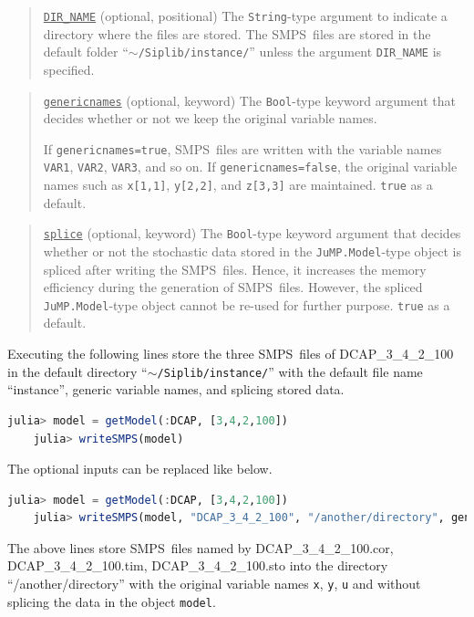 \documentclass{hitec}
\newcommand{\smps}{\textsf{SMPS}}
\newcommand{\jumpmodel}{\texttt{JuMP.Model}}
\begin{document}
	\begin{quote}
		\noindent\underline{\texttt{DIR\_NAME}} (optional, positional) The \texttt{String}-type argument to indicate a directory where the files are stored. The \smps\ files are stored in the default folder ``\texttt{$\sim$/Siplib/instance/}'' unless the argument \texttt{DIR\_NAME} is specified.
	\end{quote}
	
	\begin{quote}
		\noindent\underline{\texttt{genericnames}} (optional, keyword) The \texttt{Bool}-type keyword argument that decides whether or not we keep the original variable names. 
		
		If \texttt{genericnames=true}, \smps\ files are written with the variable names \texttt{VAR1}, \texttt{VAR2}, \texttt{VAR3}, and so on. If \texttt{genericnames=false}, the original variable names such as \texttt{x[1,1]}, \texttt{y[2,2]}, and \texttt{z[3,3]} are maintained. \texttt{true} as a default.
	\end{quote}
	
	\begin{quote}
		\noindent\underline{\texttt{splice}} (optional, keyword) The \texttt{Bool}-type keyword argument that decides whether or not the stochastic data stored in the \jumpmodel-type object is spliced after writing the \smps\ files. Hence, it increases the memory efficiency during the generation of \smps\ files. However, the spliced \jumpmodel-type object cannot be re-used for further purpose. \texttt{true} as a default.
	\end{quote}
	
	Executing the following lines store the three \smps\ files of DCAP\_3\_4\_2\_100 in the default directory ``\texttt{$\sim$/Siplib/instance/}''  with the default file name ``instance'', generic variable names, and splicing stored data.
	\begin{lstlisting}[frame=single,language=julia]
	julia> model = getModel(:DCAP, [3,4,2,100])
	julia> writeSMPS(model)
	\end{lstlisting}
	The optional inputs can be replaced like below.
	\begin{lstlisting}[frame=single,language=julia]
	julia> model = getModel(:DCAP, [3,4,2,100])
	julia> writeSMPS(model, "DCAP_3_4_2_100", "/another/directory", genericnames=false, splice=false)
	\end{lstlisting}
	The above lines store \smps\ files named by DCAP\_3\_4\_2\_100.cor, DCAP\_3\_4\_2\_100.tim, DCAP\_3\_4\_2\_100.sto into the directory ``/another/directory'' with the original variable names \texttt{x}, \texttt{y}, \texttt{u} and without splicing the data in the object \texttt{model}.
	
\end{document}
